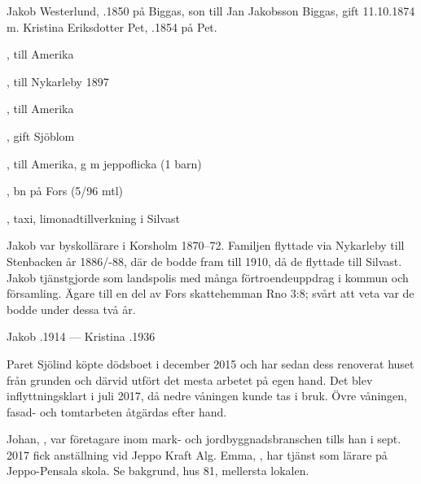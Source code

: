 %
Jakob Westerlund, .1850 på Biggas, son till Jan Jakobsson Biggas, gift 11.10.1874 m. Kristina Eriksdotter Pet, .1854 på Pet.
\begin{jhchildren}
  \item {}, till Amerika
  \item {}, till Nykarleby 1897
  \item {}, till Amerika
  \item {}, gift Sjöblom
  \item {}, till Amerika, g m jeppoflicka (1 barn)
  \item {}, bn på Fors (5/96 mtl)
  \item {}
  \item {}
  \item {}
  \item {}, taxi, limonadtillverkning i Silvast
\end{jhchildren}
Jakob var byskollärare i Korsholm 1870--72. Familjen flyttade via Nykarleby till Stenbacken år 1886/-88, där de bodde fram till 1910, då de flyttade till Silvast. Jakob tjänstgjorde som landspolis med många förtroendeuppdrag i kommun och församling. Ägare till en del av Fors skattehemman Rno 3:8; svårt att veta var de bodde under dessa två år.

Jakob .1914  --- Kristina .1936



%



%
Paret Sjölind köpte dödsboet i december 2015 och har sedan dess renoverat huset från grunden och därvid utfört det mesta arbetet på egen hand. Det blev inflyttningsklart i juli 2017, då nedre våningen kunde tas i bruk. Övre våningen, fasad- och tomtarbeten åtgärdas efter hand.
\begin{jhchildren}
  \item {}
  \item {}
\end{jhchildren}
Johan, , var företagare inom mark- och jordbyggnadsbranschen tills han i sept. 2017 fick anställning vid Jeppo Kraft Alg. Emma, , har tjänst som lärare på Jeppo-Pensala skola. Se bakgrund, hus 81, mellersta lokalen.


